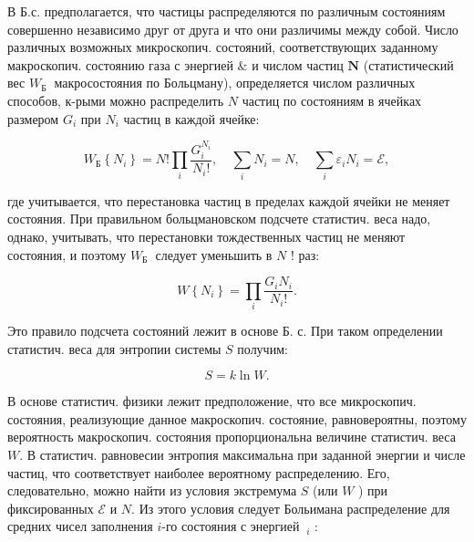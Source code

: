 \documentclass[10pt]{article}
\begin{document}
В Б.с. предполагается, что частицы распределяются по различным состояниям совершенно независимо друг от друга и что они различимы между собой. Число различных возможных микроскопич. состояний, соответствующих заданному макроскопич. состоянию газа с энергией $\mathscr{\&}$ и числом частиц $\boldsymbol{N}$ (статистический вес $W_{\text {Б }}$ макросостояния по Больцману), определяется числом различных способов, к-рыми можно распределить $N$ частиц по состояниям в ячейках размером $G_{i}$ при $N_{i}$ частиц в каждой ячейке:



\[

W_{\mathrm{Б}}\left\{N_{i}\right\}=N ! \prod_{i} \frac{G_{i}^{N_{i}}}{N_{i} !}, \quad \sum_{i} N_{i}=N, \quad \sum_{i} \varepsilon_{i} N_{i}=\mathscr{E},

\]



где учитывается, что перестановка частиц в пределах каждой ячейки не меняет состояния. При правильном больцмановском подсчете статистич. веса надо, однако, учитывать, что перестановки тождественных частиц не меняют состояния, и поэтому $W_{\text {Б }}$ следует уменьшить в $N$ ! раз:



\[

W\left\{N_{i}\right\}=\prod_{i} \frac{G_{i} N_{i}}{N_{i} !} .

\]



Это правило подсчета состояний лежит в основе Б. с. При таком определении статистич. веса для энтропии системы $S$ получим:



\[

S=k \ln W .

\]



В основе статистич. физики лежит предположение, что все микроскопич. состояния, реализующие данное макроскопич. состояние, равновероятны, поэтому вероятность макроскопич. состояния пропорциональна величине статистич. веса $W$. В статистич. равновесии энтропия максимальна при заданной энергии и числе частиц, что соответствует наиболее вероятному распределению. Его, следовательно, можно найти из условия экстремума $S$ (или $W$ ) при фиксированных $\mathscr{E}$ и $N$. Из этого условия следует Больимана распределение для средних чисел заполнения $i$-го состояния с энергией $\mathscr{~}_{i}$ :
\end{document}
